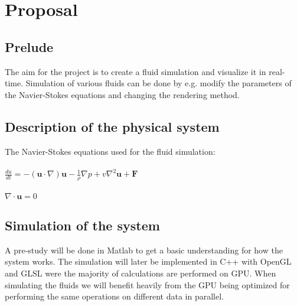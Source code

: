 \documentclass[a4paper,12pt,twoside,swedish]{report}
\begin{document}
\pagestyle{plain}

\setcounter{page}{1}

\chapter{Proposal}

\section{Prelude}
The aim for the project is to create a fluid simulation and visualize it in real-time. Simulation of various fluids can be done by e.g. modify the parameters of the Navier-Stokes equations and changing the rendering method.

\section{Description of the physical system}
The Navier-Stokes equations used for the fluid simulation:\\\\
\(\frac{du}{dt} = - (\textbf{u}\cdot{\nabla})\textbf{u} - \frac{1}{\rho}\nabla p + v \nabla^2 \textbf{u} + \textbf{F}\) \\\\
\(\nabla \cdot \textbf{u} = 0 \)

\section{Simulation of the system}
A pre-study will be done in Matlab to get a basic understanding for how the system works. The simulation will later be implemented in C++ with OpenGL and GLSL were the majority of calculations are performed on GPU. When simulating the fluids we will benefit heavily from the GPU being optimized for performing the same operations on different data in parallel.
\end{document}

